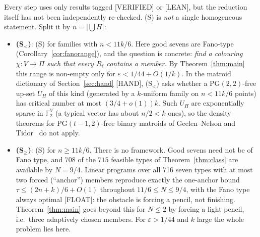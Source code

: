 \documentclass[11pt]{article}
\theoremstyle{definition}
\newcommand{\st}[1]{\textsf{\small[#1]}}
\newcommand{\F}{\mathbb{F}_2}
\begin{document}
Every step uses only results tagged \st{VERIFIED} or \st{LEAN}, but the reduction itself has not been independently
re-checked. (S) is \emph{not} a single homogeneous statement. Split it by $n=|\bigcup H|$:
\begin{itemize}[leftmargin=*]
\item \textbf{(S$_<$)}: (S) for families with $n<11k/6$. Here good sevens are Fano-type (Corollary~\ref{cor:fanorange}),
and the question is concrete: \emph{find a colouring $\chi:V\to\Pi$ such that every $R_\ell$ contains a member.}
By Theorem~\ref{thm:main} this range is non-empty only for $\varepsilon<1/44+O(1/k)$. In the matroid dictionary of
Section~\ref{sec:hand} \st{HAND}, (S$_<$) asks whether a $\mathrm{PG}(2,2)$-free up-set $U_H$ of this kind (generated by
a $k$-uniform family on $n<11k/6$ points) has critical number at most $(3/4+o(1))k$. Such $U_H$ are exponentially
sparse in $\F^V$ (a typical vector has about $n/2<k$ ones), so the density theorems for $\mathrm{PG}(t-1,2)$-free
binary matroids of Geelen--Nelson and Tidor~\cite{GN,Tid} do not apply.
\item \textbf{(S$_\ge$)}: (S) for $n\ge11k/6$. There is no framework. Good sevens need not be of Fano type, and $708$
of the $715$ feasible types of Theorem~\ref{thm:class} are available by $N=9/4$. Linear programs over all
716 seven types with at most two forced (``anchor'') members reproduce exactly the one-anchor bound
$\tau\le(2n+k)/6+O(1)$ throughout $11/6\le N\le9/4$, with the Fano type always optimal \st{FLOAT}: the obstacle is forcing a pencil, not finishing.
Theorem~\ref{thm:main} goes beyond this for $N\le2$ by forcing a light pencil, i.e.\ three adaptively chosen
members. For $\varepsilon>1/44$ and $k$ large the whole problem lies here.
\end{itemize}
\end{document}

